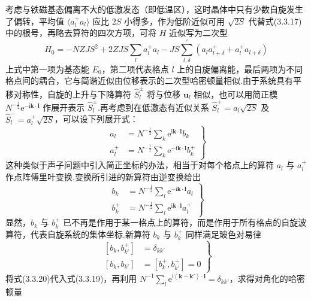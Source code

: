 考虑与铁磁基态偏离不大的低激发态（即低温区），这时晶体中只有少数自旋发生了偏转，平均值
$\langle a_l^{+}a_l\rangle$ 应比 $2S$ 小得多，作为低阶近似可用 $\sqrt{2S}$
代替式(3.3.17)中的根号，再略去算符的四次方项，可将 $H$ 近似写为二次型
\begin{equation}
  H_0=-NZJS^2+2ZJS\sum_l a_l^{+}a_l
  -JS\sum_{l,\delta}^{\prime}\left(a_l a_{l+\delta}^{+}+a_l^{+}a_{l+\delta}\right)
\end{equation}
上式中第一项为基态能 $E_0$，第二项代表格点 $l$ 上的自旋偏离能，最后两项为不同格点间的耦合，它与简谐近似由位移表示的二次型哈密顿量相似.由于系统具有平移对称性，自旋的上升与下降算符
$\hat{S}_l^{\pm}$ 将与位移 $\boldsymbol{u}_l$ 相似，也可以用简正模
$N^{-\frac{1}{2}}\mathrm{e}^{-\mathrm{i}\boldsymbol{k}\cdot\boldsymbol{l}}$ 作展开表示 $\hat{S}_l^{\pm}$.再考虑到在低激态有近似关系
$\hat{S}_l^{+}=a_l\sqrt{2S}$ 及 $\hat{S}_l^{-}=a_l^{+}\sqrt{2S}$，可以设下列展开式：
\begin{equation}
  \left.\begin{aligned}
    a_l&=N^{-\frac{1}{2}}\sum_k\mathrm{e}^{\mathrm{i}\boldsymbol{k}\cdot\boldsymbol{l}}b_k\\
    a_l^{+}&=N^{-\frac{1}{2}}\sum_k\mathrm{e}^{-\mathrm{i}\boldsymbol{k}\cdot\boldsymbol{l}}b_k^{+}
  \end{aligned}\right\}
\end{equation}
这种类似于声子问题中引入简正坐标的办法，相当于对每个格点上的算符 $a_l$ 与 $a_l^{+}$
作点阵傅里叶变换.变换所引进的新算符由逆变换给出
\begin{equation}
  \left.\begin{aligned}
    b_k&=N^{-\frac{1}{2}}\sum_l\mathrm{e}^{-\mathrm{i}\boldsymbol{k}\cdot\boldsymbol{l}}a_l\\
    b_k^{+}&=N^{-\frac{1}{2}}\sum_l\mathrm{e}^{\mathrm{i}\boldsymbol{k}\cdot\boldsymbol{l}}a_l^{+}
  \end{aligned}\right\}
\end{equation}
显然，$b_k$ 与 $b_k^{+}$ 已不再是作用于某一格点上的算符，而是作用于所有格点的自旋波算符，代表自旋系统的集体坐标.新算符
$b_k$ 与 $b_k^{+}$ 同样满足玻色对易律
\begin{equation}
  \left.\begin{aligned}
    \left[b_k,b_{k'}^{+}\right]&=\delta_{kk'}\\
    \left[b_k,b_{k'}\right]&=\left[b_k^{+},b_{k'}^{+}\right]=0
  \end{aligned}\right\}
\end{equation}
将式(3.3.20)代入式(3.3.19)，再利用
$N^{-1}\sum_l\mathrm{e}^{\mathrm{i}\left(\boldsymbol{k}-\boldsymbol{k}'\right)\cdot\boldsymbol{l}}=\delta_{kk'}$，求得对角化的哈密顿量
